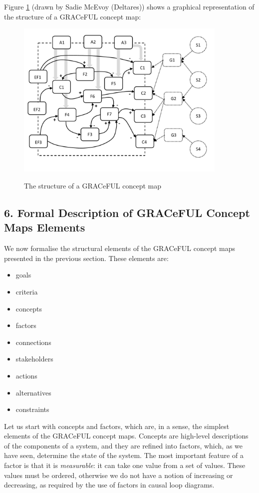 \documentclass[]{article}
\begin{document}
Figure \ref{fig:cm} (drawn by Sadie McEvoy (Deltares)) shows a
graphical representation of the structure of a GRACeFUL concept map:

\begin{figure}[!ht]%
  \centering
 {{\includegraphics[width=0.9\textwidth]{../s4.pdf} }}%
  \caption{The structure of a GRACeFUL concept map}%
  \label{fig:cm}%
\end{figure}

\subsection{6. Formal Description of GRACeFUL Concept Maps
Elements}\label{formal-description-of-graceful-concept-maps-elements}

We now formalise the structural elements of the GRACeFUL concept maps
presented in the previous section. These elements are:

\begin{itemize}
\itemsep1pt\parskip0pt
\item
  goals
\item
  criteria
\item
  concepts
\item
  factors
\item
  connections
\item
  stakeholders
\item
  actions
\item
  alternatives
\item
  constraints
\end{itemize}

Let us start with concepts and factors, which are, in a sense, the
simplest elements of the GRACeFUL concept maps. Concepts are high-level
descriptions of the components of a system, and they are refined into
factors, which, as we have seen, determine the state of the system. The
most important feature of a factor is that it is \emph{measurable}: it
can take one value from a set of values. These values must be ordered,
otherwise we do not have a notion of increasing or decreasing, as
required by the use of factors in causal loop diagrams.
\end{document}
